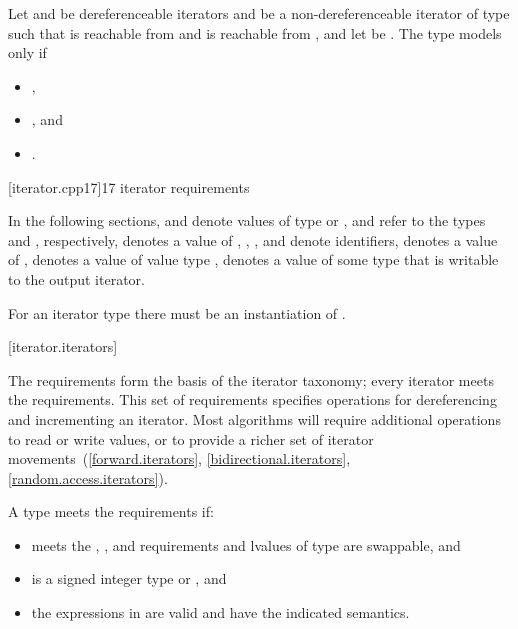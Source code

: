 \pnum
Let  and  be dereferenceable iterators and
 be a non-dereferenceable iterator of type 
such that  is reachable from  and
 is reachable from ,
and let  be .
The type  models  only if
\begin{itemize}
\item {},
\item {}, and
\item {}.
\end{itemize}

[iterator.cpp17]{\Cpp{}17 iterator requirements}

\pnum
In the following sections,
and
denote values of type
 or ,
 and  refer to the
types  and
, respectively,
denotes a value of
,
,
,
and
denote identifiers,
denotes a value of
,
denotes a value of value type
,
denotes a value of some type that is writable to the output iterator.
\begin{note}
For an iterator type  there must be an instantiation
of .
\end{note}

[iterator.iterators]{}

\pnum
The  requirements form the basis of the iterator
taxonomy; every iterator meets the  requirements. This
set of requirements specifies operations for dereferencing and incrementing
an iterator. Most algorithms will require additional operations to
read or write values, or
to provide a richer set of iterator movements~(\ref{forward.iterators},
\ref{bidirectional.iterators}, \ref{random.access.iterators}).

\pnum
A type  meets the  requirements if:
\begin{itemize}
\item {} meets the , , and
 requirements and lvalues
of type  are swappable, and

\item {} is a signed integer type or , and

\item the expressions in  are valid and have
the indicated semantics.
\end{itemize}

